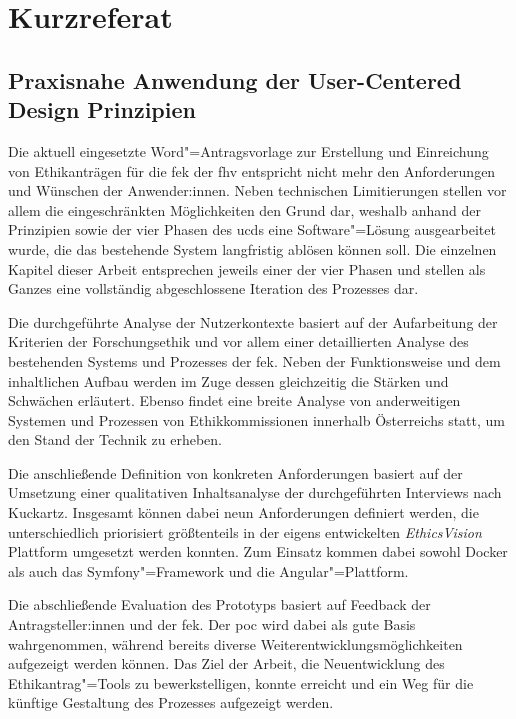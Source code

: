 \documentclass[a4paper,12pt,twoside]{scrreprt}
\begin{document}
\cleardoublepage
{}
\section*{Kurzreferat}
\label{sec:abstract-de}

\subsection*{Praxisnahe Anwendung der User-Centered Design Prinzipien}

Die aktuell eingesetzte Word"=Antragsvorlage zur Erstellung und Einreichung von Ethikanträgen für die \acl{fek} der \acl{fhv} entspricht nicht mehr den Anforderungen und Wünschen der Anwender:innen. Neben technischen Limitierungen stellen vor allem die eingeschränkten Möglichkeiten den Grund dar, weshalb anhand der Prinzipien sowie der vier Phasen des \acl{ucd}s eine Software"=Lösung ausgearbeitet wurde, die das bestehende System langfristig ablösen können soll. Die einzelnen Kapitel dieser Arbeit entsprechen jeweils einer der vier Phasen und stellen als Ganzes eine vollständig abgeschlossene Iteration des Prozesses dar.

\smallskip

Die durchgeführte Analyse der Nutzerkontexte basiert auf der Aufarbeitung der Kriterien der Forschungsethik und vor allem einer detaillierten Analyse des bestehenden Systems und Prozesses der \acl{fek}. Neben der Funktionsweise und dem inhaltlichen Aufbau werden im Zuge dessen gleichzeitig die Stärken und Schwächen erläutert. Ebenso findet eine breite Analyse von anderweitigen Systemen und Prozessen von Ethikkommissionen innerhalb Österreichs statt, um den Stand der Technik zu erheben.

\smallskip

Die anschließende Definition von konkreten Anforderungen basiert auf der Umsetzung einer qualitativen Inhaltsanalyse der durchgeführten Interviews nach Kuckartz. Insgesamt können dabei neun Anforderungen definiert werden, die unterschiedlich priorisiert größtenteils in der eigens entwickelten \textit{EthicsVision} Plattform umgesetzt werden konnten. Zum Einsatz kommen dabei sowohl Docker als auch das Symfony"=Framework und die Angular"=Plattform.

\smallskip

Die abschließende Evaluation des Prototyps basiert auf Feedback der Antragsteller:innen und der \acl{fek}. Der \acl{poc} wird dabei als gute Basis wahrgenommen, während bereits diverse Weiterentwicklungsmöglichkeiten aufgezeigt werden können. Das Ziel der Arbeit, die Neuentwicklung des Ethikantrag"=Tools zu bewerkstelligen, konnte erreicht und ein Weg für die künftige Gestaltung des Prozesses aufgezeigt werden.
\end{document}
